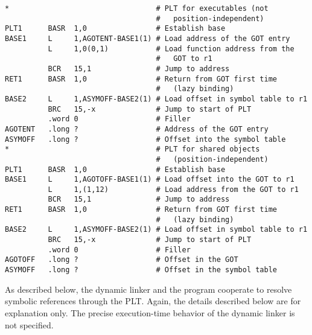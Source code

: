 \documentclass[english,11pt,twoside,toc=bib,toc=idx]{scrreprt}
\begin{document}
\begin{lstlisting}[style=float,language=simpleasm,
  caption=Procedure Linkage Table example,label=lst:pltex]
*                                  # PLT for executables (not
                                   #   position-independent)
PLT1      BASR  1,0                # Establish base
BASE1     L     1,AGOTENT-BASE1(1) # Load address of the GOT entry
          L     1,0(0,1)           # Load function address from the
                                   #   GOT to r1
          BCR   15,1               # Jump to address
RET1      BASR  1,0                # Return from GOT first time
                                   #   (lazy binding)
BASE2     L     1,ASYMOFF-BASE2(1) # Load offset in symbol table to r1
          BRC   15,-x              # Jump to start of PLT
          .word 0                  # Filler
AGOTENT   .long ?                  # Address of the GOT entry
ASYMOFF   .long ?                  # Offset into the symbol table
*                                  # PLT for shared objects
                                   #   (position-independent)
PLT1      BASR  1,0                # Establish base
BASE1     L     1,AGOTOFF-BASE1(1) # Load offset into the GOT to r1
          L     1,(1,12)           # Load address from the GOT to r1
          BCR   15,1               # Jump to address
RET1      BASR  1,0                # Return from GOT first time
                                   #   (lazy binding)
BASE2     L     1,ASYMOFF-BASE2(1) # Load offset in symbol table to r1
          BRC   15,-x              # Jump to start of PLT
          .word 0                  # Filler
AGOTOFF   .long ?                  # Offset in the GOT
ASYMOFF   .long ?                  # Offset in the symbol table
\end{lstlisting}
\fi

As described below, the dynamic linker and the program cooperate to
resolve symbolic references through the PLT\@.  Again, the details
described below are for explanation only.  The precise execution-time
behavior of the dynamic linker is not specified.
\end{document}
